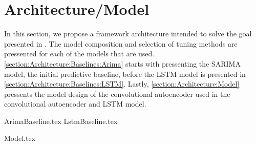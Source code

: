 \chapter{Architecture/Model}
\label{section:Architecture}

In this section, we propose a framework architecture intended to solve the goal presented in .
The model composition and selection of tuning methods are pressented for each of the models that are used.
\cref{section:Architecture:Baselines:Arima} starts with pressenting the SARIMA model, the initial predictive baseline,
before the LSTM model is presented in \cref{section:Architecture:Baselines:LSTM}.
Lastly, \cref{section:Architecture:Model} pressents the model design of the convolutional autoencoder used in the 
convolutional autoencoder and LSTM model.


{ArimaBaseline.tex}
{LstmBaseline.tex}

{Model.tex}

